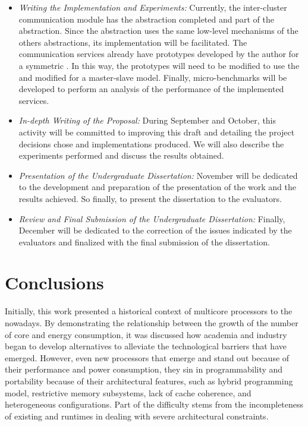 	\begin{itemize}
		\item \textit{Writing the Implementation and Experiments:}
			Currently, the inter-cluster communication module has the \sync abstraction
			completed and part of the \mailbox abstraction.
			Since the \portal abstraction uses the same low-level mechanisms of the others
			abstractions, its implementation will be facilitated.
			The communication services already have prototypes developed by the author
			for a symmetric \os.
			In this way, the prototypes will need to be modified to use the \hal and
			modified for a master-slave model.
			Finally, micro-benchmarks will be developed to perform an analysis of the
			performance of the implemented services.
		\item \textit{In-depth Writing of the Proposal:}
			During September and October, this activity will be committed to improving
			this draft and detailing the project decisions chose and implementations produced.
			We will also describe the experiments performed and discuss the results obtained.
		\item \textit{Presentation of the Undergraduate Dissertation:}
			November will be dedicated to the development and preparation of the presentation
			of the work and the results achieved.
			So finally, to present the dissertation to the evaluators.
		\item \textit{Review and Final Submission of the Undergraduate Dissertation:}
			Finally, December will be dedicated to the correction of the issues indicated
			by the evaluators and finalized with the final submission of the dissertation.
	\end{itemize}

 \chapter{Conclusions}
\label{ch.conclusions}

Initially, this work presented a historical context of multicore
processors to the nowadays.
By demonstrating the relationship between the growth of the number
of core and energy consumption, it was discussed how academia and
industry began to develop alternatives to alleviate the technological
barriers that have emerged.
However, even new processors that emerge and stand out because of
their performance and power consumption,
they sin in programmability and portability because of their architectural
features, such as hybrid programming model, restrictive memory subsystems,
lack of cache coherence, and heterogeneous configurations.
Part of the difficulty stems from the incompleteness of existing \oses and
runtimes in dealing with severe architectural constraints.

